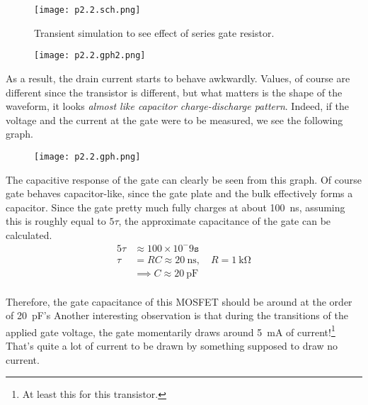 \documentclass[../main.tex]{subfiles}
\begin{document}
        \begin{figure}[H]\centering
            \texttt{[image: p2.2.sch.png]}
            \caption{Transient simulation to see effect of series gate resistor.}\label{fig:p2.2.sch}
        \end{figure}

        \begin{figure}[H]\centering
            \texttt{[image: p2.2.gph2.png]}
            \caption{}\label{fig:p2.2.gph}
        \end{figure}

        As a result, the drain current starts to behave awkwardly. 
        Values, of course are different since the transistor is different, but what matters is the shape of the
        waveform, it looks \textit{almost like capacitor charge-discharge pattern}. Indeed, if the voltage 
        and the current at the gate were to be measured, we see the following graph.

        \begin{figure}[H]\centering
            \texttt{[image: p2.2.gph.png]}
            \caption{}\label{fig:p2.2.gph2}
        \end{figure}

        \pagebreak
        The capacitive response of the gate can clearly be seen from this graph. Of course
        gate behaves capacitor-like, since the gate plate and the bulk effectively forms a capacitor. 
        Since the gate pretty much fully charges at about \SI{100}{\nano\second}, assuming this is 
        roughly equal to $5 \tau$, the approximate capacitance of the gate can be calculated.
        \begin{equation*}\begin{aligned}
            5\tau &\approx 100\times 10^-9 \texttt{s}\\
            \tau &= RC \approx \SI{20}{\nano\second}, \quad R=\SI{1}{\kilo\ohm}\\
            &\implies C \approx \SI{20}{\pico\farad}\\
        \end{aligned}\end{equation*}

        Therefore, the gate capacitance of this MOSFET should be around at the order of \SI{20}{\pico\farad}'s  
        Another interesting observation is that during the transitions of the applied gate voltage, the gate momentarily draws 
        around \SI{5}{\milli\ampere} of current!\footnote{At least this for this transistor.} That's 
        quite a lot of current to be drawn by something supposed to draw no current.  
        \pagebreak
\end{document}
